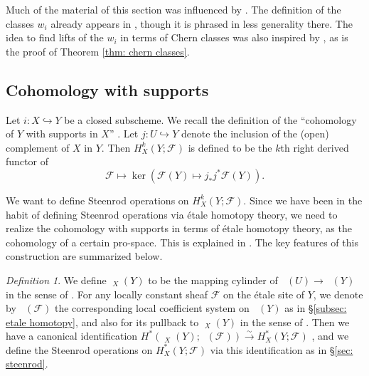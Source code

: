 \documentclass[10pt, reqno]{amsart}
\numberwithin{equation}{subsection}
\newcommand{\Cal}[1]{\mathcal{#1}}
\newcommand{\co}{\colon}
\DeclareMathOperator{\Et}{\acute{E}t}
\theoremstyle{remark}
\newtheorem{remark}[thm]{Remark}
\newtheorem{defn}[thm]{Definition}
\begin{document}
Much of the material of this section was influenced by \cite{Urabe96}. The definition of the classes $w_i$ already appears in \cite{Urabe96}, though it is phrased in less generality there. The idea to find lifts of the $w_i$ in terms of Chern classes was also inspired by \cite{Urabe96}, as is the proof of Theorem \ref{thm: chern classes}. 

\subsection{Cohomology with supports}\label{subsec: steenrod on relative coh}

Let $i \co X \hookrightarrow Y$ be a closed subscheme. We recall the definition of the ``cohomology of $Y$ with supports in $X$'' \cite[\S I.10]{FK88}.
 Let $j \colon U \hookrightarrow Y$ denote the inclusion of the (open) complement of $X$ in $Y$. Then $H_X^k(Y; \Cal{F})$ is defined to be the $k$th right derived functor of 
\[
\Cal{F} \mapsto \ker (\Cal{F}(Y) \mapsto j_*j^* \Cal{F}(Y)).
\] 
 


We want to define Steenrod operations on $H_X^k(Y; \Cal{F})$. Since we have been in the habit of defining Steenrod operations via \'{e}tale homotopy theory, we need to realize the cohomology with supports in terms  of \'{e}tale homotopy theory, as the cohomology of a certain pro-space. This is explained in \cite[\S 14]{Fr82}. The key features of this construction are summarized below.  

\begin{defn}
We define $\Et_X(Y) $ to be the mapping cylinder of $\Et(U) \rightarrow \Et(Y)$ in the sense of \cite[p. 140]{Fr82}. For any locally constant sheaf $\Cal{F}$ on the \'{e}tale site of $Y$, we denote by $\Et(\Cal{F})$ the corresponding local coefficient system on $\Et(Y)$ as in \S  \ref{subsec: etale homotopy}, and also for its pullback to $\Et_X(Y) $ in the sense of \cite[p. 140]{Fr82}. Then we have a canonical identification $H^*(\Et_X(Y); \Et(\Cal{F})) \xrightarrow{\sim} H^*_X(Y; \Cal{F})$ \cite[Proposition 14.3, Corollary 14.5, Proposition 14.6]{Fr82}, and we define the Steenrod operations on $H^*_X(Y; \Cal{F})$ via this identification as in \S \ref{sec: steenrod}.
\end{defn}
\end{document}
